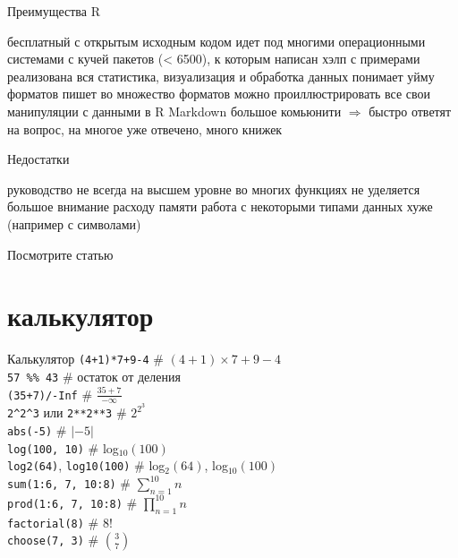 \begin{frame}{Преимущества R}
\begin{itemize}
\mytem бесплатный
\mytem с открытым исходным кодом
\mytem идет под многими операционными системами
\mytem с кучей пакетов (< 6500), к которым написан хэлп с примерами
\mytem реализована вся статистика, визуализация и обработка данных
\mytem понимает уйму форматов
\mytem пишет во множество форматов
\mytem можно проиллюстрировать все свои манипуляции с данными в R Markdown
\mytem большое комьюнити $\Rightarrow$ быстро ответят на вопрос, на многое уже отвечено, много книжек
\end{itemize}
\end{frame}
\begin{frame}{Недостатки}
\begin{itemize}
\mytem руководство не всегда на высшем уровне
\mytem во многих функциях не уделяется большое внимание расходу памяти
\mytem работа с некоторыми типами данных хуже (например с символами)
\end{itemize}
\vfill
Посмотрите статью \href{http://blog.dominodatalab.com/comparing-python-and-r-for-data-science/}{{\color{red!13!blue}{Comparing Python and R for Data Science}}}
\end{frame}
\section{калькулятор}
\begin{frame}[fragile]{Калькулятор}
\footnotesize
\verb"(4+1)*7+9-4" \hfill \# $(4+1)\times 7+9-4$ \\ \vfill
\verb"57 %% 43" \hfill \# остаток от деления \\ \vfill
\verb"(35+7)/-Inf" \hfill \# {\large $\frac{35+7}{-\infty}$} \\ \vfill
\verb"2^2^3" или \verb"2**2**3" \hfill \# $2^{2^3}$ \\ \vfill
\verb"abs(-5)" \hfill \# $|-5|$ \\ \vfill
\verb"log(100, 10)" \hfill \# log$_{10}(100)$ \\ \vfill
\verb"log2(64)", \verb"log10(100)" \hfill \# log$_2(64)$, log$_{10}(100)$\\ \vfill
\verb"sum(1:6, 7, 10:8)" \hfill \# $\sum\limits_{n=1}^{10}  n$\\ \vfill
\verb"prod(1:6, 7, 10:8)" \hfill \# $\prod\limits_{n=1}^{10}  n$\\ \vfill
\verb"factorial(8)" \hfill \# $8!$\\ \vfill
\verb"choose(7, 3)" \hfill \# {\large $3 \choose 7$}\\
\end{frame}
